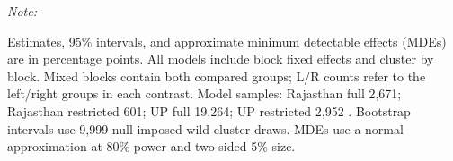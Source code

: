 \begin{table}
{\begin{threeparttable}
\begin{tabular}[t]{llllrllll}
\bottomrule
\end{tabular}
\begin{tablenotes}
\item \textit{Note: }
\item Estimates, 95\% intervals, and approximate minimum detectable effects (MDEs) are in percentage points. All models include block fixed effects and cluster by block. Mixed blocks contain both compared groups; L/R counts refer to the left/right groups in each contrast. Model samples: Rajasthan full 2,671; Rajasthan restricted 601; UP full 19,264; UP restricted 2,952 . Bootstrap intervals use 9,999 null-imposed wild cluster draws. MDEs use a normal approximation at 80\% power and two-sided 5\% size.
\end{tablenotes}
\end{threeparttable}}
\end{table}

